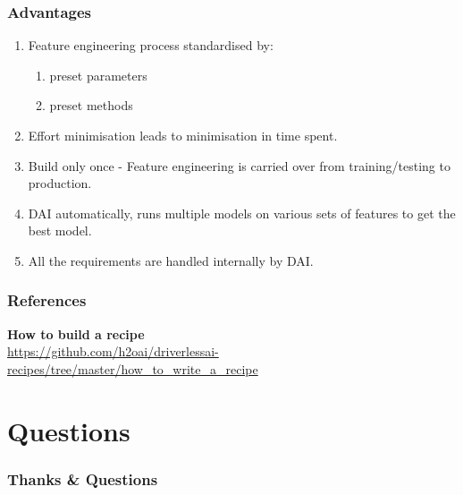 \documentclass[11pt,
               aspectratio=169,
               hyperref={colorlinks}
               ]{beamer}
\begin{document}
	\begin{frame}
		\frametitle{Advantages}
		\begin{enumerate}
			\item Feature engineering process standardised by:
				\begin{enumerate}
					\item preset parameters
					\item preset methods
				\end{enumerate}
			\item Effort minimisation leads to minimisation in time spent.
			\item Build only once - Feature engineering is carried over from training/testing to production.
			\item DAI automatically, runs multiple models on various sets of features to get the best model. 
			\item All the requirements are handled internally by DAI. 
		\end{enumerate}
\end{frame}

	\begin{frame}[t, allowframebreaks]
	
		\frametitle{References}	
		
			\textbf{How to build a recipe}\\
			\small{\url{https://github.com/h2oai/driverlessai-recipes/tree/master/how_to_write_a_recipe}}
			
		\framebreak		
		
		\printbibliography
		
	\end{frame}
	\section{Questions}

		\begin{frame}

			\frametitle{Thanks \& Questions}

		\end{frame}

\end{document}
